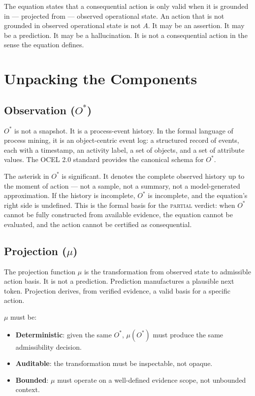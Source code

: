 The equation states that a consequential action is only valid when it is grounded in --- projected from --- observed operational state. An action that is not grounded in observed operational state is not $A$. It may be an assertion. It may be a prediction. It may be a hallucination. It is not a consequential action in the sense the equation defines.

\section{Unpacking the Components}

\subsection{Observation ($O^{*}$)}

$O^{*}$ is not a snapshot. It is a process-event history. In the formal language of process mining, it is an object-centric event log: a structured record of events, each with a timestamp, an activity label, a set of objects, and a set of attribute values. The OCEL 2.0 standard \cite{vanderaalst2022ocel} provides the canonical schema for $O^{*}$.

The asterisk in $O^{*}$ is significant. It denotes the complete observed history up to the moment of action --- not a sample, not a summary, not a model-generated approximation. If the history is incomplete, $O^{*}$ is incomplete, and the equation's right side is undefined. This is the formal basis for the \textsc{partial} verdict: when $O^{*}$ cannot be fully constructed from available evidence, the equation cannot be evaluated, and the action cannot be certified as consequential.

\subsection{Projection ($\mu$)}

The projection function $\mu$ is the transformation from observed state to admissible action basis. It is not a prediction. Prediction manufactures a plausible next token. Projection derives, from verified evidence, a valid basis for a specific action.

$\mu$ must be:
\begin{itemize}
  \item \textbf{Deterministic}: given the same $O^{*}$, $\mu(O^{*})$ must produce the same admissibility decision.
  \item \textbf{Auditable}: the transformation must be inspectable, not opaque.
  \item \textbf{Bounded}: $\mu$ must operate on a well-defined evidence scope, not unbounded context.
\end{itemize}

